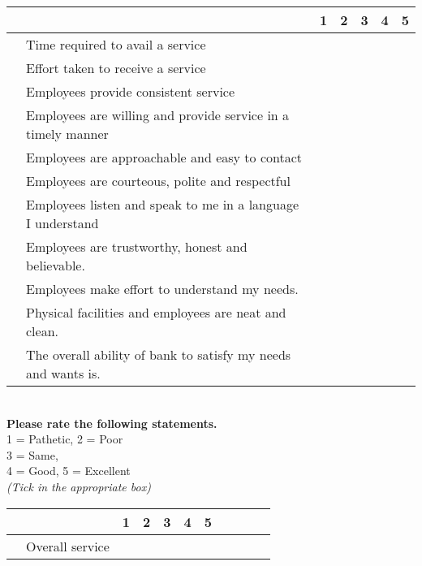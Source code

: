 \documentclass[10pt,a4paper]{article}
\newcounter{magicrownumbers}
\newcommand\rownumber{\stepcounter{magicrownumbers}\arabic{magicrownumbers}}
\newcommand \tab[1][1cm]{\hspace*{#1}}
\begin{document}
{\begin{minipage}{\textwidth}
\begin{tabularx}{\linewidth}{|l|l|X|X|X|X|X|}
\hline \multicolumn{2}{|c|}{} & 1 & 2 & 3 & 4 & 5\\
\hline \rownumber & Time required to avail a service & \tab & \tab & \tab & \tab & \tab \\
\hline \rownumber & Effort taken to receive a service & \tab & \tab & \tab & \tab & \tab \\
\hline \rownumber & Employees provide consistent service & \tab & \tab & \tab & \tab & \tab \\
\hline \rownumber & Employees are willing and provide service in a timely manner & \tab & \tab & \tab & \tab & \tab \\
\hline \rownumber & Employees are approachable and easy to contact & \tab & \tab & \tab & \tab & \tab \\
\hline \rownumber & Employees are courteous, polite and respectful & \tab & \tab & \tab & \tab & \tab \\
\hline \rownumber & Employees listen and speak to me in  a language I understand & \tab & \tab & \tab & \tab & \tab \\
\hline \rownumber & Employees are trustworthy, honest and believable. & \tab & \tab & \tab & \tab & \tab \\
\hline \rownumber & Employees make effort to understand my needs.  & \tab & \tab & \tab & \tab & \tab \\
\hline \rownumber & Physical facilities and employees are neat and clean. & \tab & \tab & \tab & \tab & \tab \\
\hline \rownumber & The overall ability of bank to satisfy my needs and wants is. & \tab & \tab & \tab & \tab & \tab \\
\hline
\end{tabularx}
\end{minipage}
\begin{minipage}{\textwidth}
\tab \\
\textbf{Please rate the following statements.}\\
1 = Pathetic, 2 = Poor\\
3 = Same,\\
4 = Good, 5 = Excellent\\
\emph {(Tick in the appropriate box)}\\
\begin{tabularx}{\linewidth}{|l|l|X|X|X|X|X|X|X|X|X|}
\hline \multicolumn{2}{|c|}{} & 1 & 2 & 3 & 4 & 5\\
\hline \rownumber & Overall service & \tab & \tab & \tab & \tab & \tab \\
\hline
\end{tabularx}
\end{minipage}
}
\end{document}
